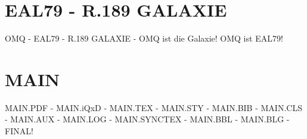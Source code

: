 \documentclass{MAIN}
\begin{document}
\maketitle
\section*{EAL79 - R.189 GALAXIE}
OMQ - EAL79 - R.189 GALAXIE - OMQ ist die Galaxie! OMQ ist EAL79!
\section*{MAIN}
MAIN.PDF - MAIN.iQxD - MAIN.TEX - MAIN.STY - MAIN.BIB - MAIN.CLS - MAIN.AUX - MAIN.LOG - MAIN.SYNCTEX - MAIN.BBL - MAIN.BLG - FINAL!
\cite{omq_eal79}

\end{document}
